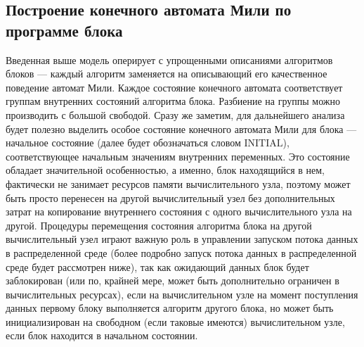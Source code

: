 \documentclass[10pt,a4paper]{article}
\newcommand{\initial}{\text{INITIAL}}
\begin{document}
\subsection{Построение конечного автомата Мили по программе блока}
Введенная выше модель оперирует с упрощенными описаниями алгоритмов блоков --- каждый алгоритм заменяется на описывающий его качественное поведение автомат Мили.
Каждое состояние конечного автомата соответствует группам внутренних состояний алгоритма блока. Разбиение на группы можно производить с большой свободой.
Сразу же заметим, для дальнейшего анализа будет полезно выделить особое состояние конечного автомата Мили для блока --- начальное состояние (далее будет обозначаться словом $\initial$), соответствующее начальным значениям внутренних переменных. Это состояние обладает значительной особенностью, а именно, блок находящийся в нем, фактически
не занимает ресурсов памяти вычислительного узла, поэтому может быть просто перенесен на другой вычислительный узел без дополнительных затрат
на копирование внутреннего состояния с одного вычислительного узла на другой. Процедуры перемещения состояния алгоритма блока на другой
вычислительный узел играют важную роль в управлении запуском потока данных в распределенной среде (более подробно запуск потока данных в распределенной среде будет рассмотрен ниже), так как ожидающий данных блок будет заблокирован (или по, крайней мере, может быть дополнительно ограничен в вычислительных ресурсах),
если на вычислительном узле на момент поступления данных первому блоку выполняется алгоритм другого блока, но может быть инициализирован на свободном
(если таковые имеются) вычислительном узле, если блок находится в начальном состоянии.
\end{document}
